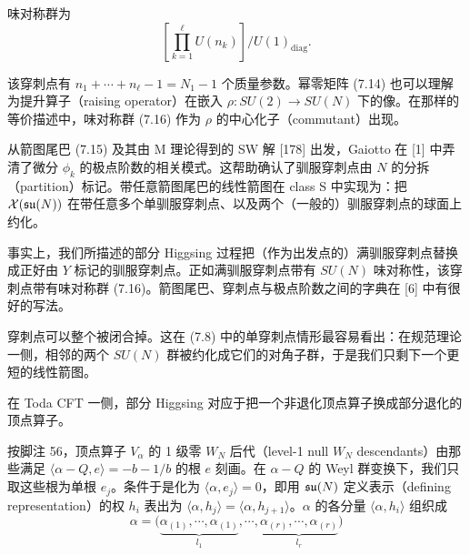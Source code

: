 味对称群为
\begin{equation}
    \left[\prod_{k=1}^{\ell} U(n_k)\right]/U(1)_{\mathrm{diag}}.
    \tag{7.16}
\end{equation}

该穿刺点有 $n_1+\cdots+n_\ell-1=N_1-1$ 个质量参数。幂零矩阵 (7.14) 也可以理解为提升算子（raising operator）在嵌入 $\rho\colon SU(2)\to SU(N)$ 下的像。在那样的等价描述中，味对称群 (7.16) 作为 $\rho$ 的中心化子（commutant）出现。

 从箭图尾巴 (7.15) 及其由 M 理论得到的 SW 解 [178] 出发，Gaiotto 在 [1] 中弄清了微分 $\phi_k$ 的极点阶数的相关模式。这帮助确认了驯服穿刺点由 $N$ 的分拆（partition）标记。带任意箭图尾巴的线性箭图在 class S 中实现为：把 $\mathcal{X}(\mathfrak{su}(N))$ 在带任意多个单驯服穿刺点、以及两个（一般的）驯服穿刺点的球面上约化。

事实上，我们所描述的部分 Higgsing 过程把（作为出发点的）满驯服穿刺点替换成正好由 $Y$ 标记的驯服穿刺点。正如满驯服穿刺点带有 $SU(N)$ 味对称性，该穿刺点带有味对称群 (7.16)。箭图尾巴、穿刺点与极点阶数之间的字典在 [6] 中有很好的写法。

穿刺点可以整个被闭合掉。这在 (7.8) 中的单穿刺点情形最容易看出：在规范理论一侧，相邻的两个 $SU(N)$ 群被约化成它们的对角子群，于是我们只剩下一个更短的线性箭图。

 在 Toda CFT 一侧，部分 Higgsing 对应于把一个非退化顶点算子换成部分退化的顶点算子。

按脚注 56，顶点算子 $V_\alpha$ 的 1 级零 $W_N$ 后代（level-1 null $W_N$ descendants）由那些满足 $\langle\alpha-Q,e\rangle=-b-1/b$ 的根 $e$ 刻画。在 $\alpha-Q$ 的 Weyl 群变换下，我们只取这些根为单根 $e_j$。条件于是化为 $\langle\alpha,e_j\rangle=0$，即用 $\mathfrak{su}(N)$ 定义表示（defining representation）的权 $h_i$ 表出为 $\langle\alpha,h_j\rangle=\langle\alpha,h_{j+1}\rangle$。$\alpha$ 的各分量 $\langle\alpha,h_i\rangle$ 组织成
\begin{equation}
    \alpha=\big(\underbrace{\alpha_{(1)},\cdots,\alpha_{(1)}}_{l_1},\cdots,\underbrace{\alpha_{(r)},\cdots,\alpha_{(r)}}_{l_r}\big)
    \tag{7.17}
\end{equation}


